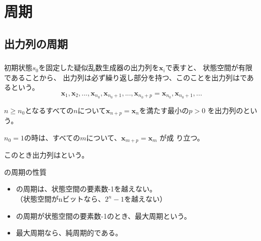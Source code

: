 \documentclass[cjk, dvips, handout, trans, xcolor=dvipsnames, hyperref={bookmarks=false}]{beamer}
\def\bx{{{\mathbf x}}}
\begin{document}
\section{周期}
\subsection{出力列の周期}
\begin{frame}[t]
  \frametitle{\insertsubsection}
  初期状態$s_0$を固定した疑似乱数生成器の出力列を$\bx_i$で表すと、
  状態空間が有限であることから、
  出力列は必ず繰り返し部分を持つ、このことを出力列はであるという。
  \[
  \bx_1, \bx_2, ..., \bx_{n_0}, \bx_{n_0 + 1}, ..., \bx_{n_0 + p} = \bx_{n_0},
  \bx_{n_0+1}, ...
  \]

  \pause
  $n \ge n_0$となるすべての$n$について$\bx_{n + p} = \bx_{n}$を満たす最小の$p > 0$
  を出力列のという。

  \pause
  $n_0 = 1$の時は、すべての$m$について、$\bx_{m + p} = \bx_m$ が成
  り立つ。

  このとき出力列はという。

  \pause
  \begin{block}{\FLPRNG の周期の性質}
    \begin{itemize}
    \item \FLPRNG の周期は、状態空間の要素数-1を越えない。\\
      （状態空間がnビットなら、$2^n-1$を越えない）
    \item \FLPRNG の周期が状態空間の要素数-1のとき、最大周期という。
    \item 最大周期なら、純周期的である。
    \end{itemize}
  \end{block}
\end{frame}
\end{document}
